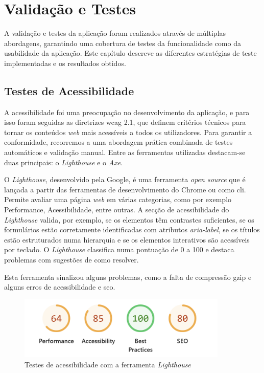 \chapter{Validação e Testes}
\label{ch:validacaoTestes}

A validação e testes da aplicação foram realizados através de múltiplas abordagens, garantindo uma cobertura de testes  da funcionalidade como da usabilidade da aplicação. Este capítulo descreve as diferentes estratégias de teste implementadas e os resultados obtidos.

\section{Testes de Acessibilidade}

A acessibilidade foi uma preocupação no desenvolvimento da aplicação, e para isso foram seguidas as diretrizes \gls{wcag} 2.1, que definem critérios técnicos para tornar os conteúdos \textit{web} mais acessíveis a todos os utilizadores. Para garantir a conformidade, recorremos a uma abordagem prática combinada de testes automáticos e validação manual. Entre as ferramentas utilizadas destacam-se duas principais: o \textit{Lighthouse} e o \textit{Axe}.

O \textit{Lighthouse}, desenvolvido pela Google, é uma ferramenta \textit{open source} que é lançada a partir das ferramentas de desenvolvimento do Chrome ou como \gls{cli}. Permite avaliar uma página \textit{web} em várias categorias, como por exemplo Performance, Acessibilidade, entre outras. A secção de acessibilidade do \textit{Lighthouse} valida, por exemplo, se os elementos têm contrastes suficientes, se os formulários estão corretamente identificadas com atributos \textit{aria-label}, se os títulos estão estruturados numa hierarquia e se os elementos interativos são acessíveis por teclado. O \textit{Lighthouse} classifica numa pontuação de 0 a 100 e destaca problemas com sugestões de como resolver.

Esta ferramenta sinalizou alguns problemas, como a falta de compressão \gls{gzip} e alguns erros de acessibilidade e \gls{seo}. 

\begin{figure}[H]
\centering
\includegraphics[max width=10cm]{./img/lh_before}
\caption{Testes de acessibilidade com a ferramenta \textit{Lighthouse}}
\end{figure}

